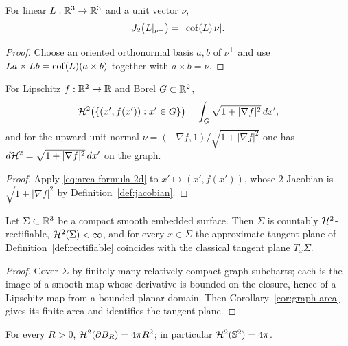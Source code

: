 \begin{lemma}\label{lem:cofactor}
For linear $L:\mathbb R^3\to\mathbb R^3$ and a unit vector $\nu$,
\begin{equation}\label{eq:cofactor}
  J_2\bigl(L|_{\nu^\perp}\bigr)=|\operatorname{cof}(L)\,\nu| .
\end{equation}
\end{lemma}

\begin{proof}
Choose an oriented orthonormal basis $a,b$ of $\nu^\perp$ and use
$La\times Lb=\operatorname{cof}(L)(a\times b)$ together with $a\times b=\nu$.
\end{proof}

\begin{corollary}\label{cor:graph-area}
For Lipschitz $f:\mathbb R^2\to\mathbb R$ and Borel $G\subset\mathbb R^2$,
\[
  \mathcal H^2\bigl(\{(x',f(x')):x'\in G\}\bigr)
  =\int_G\sqrt{1+|\nabla f|^2}\,dx' ,
\]
and for the upward unit normal
$\nu=(-\nabla f,1)/\sqrt{1+|\nabla f|^2}$ one has
$d\mathcal H^2=\sqrt{1+|\nabla f|^2}\,dx'$ on the graph.
\end{corollary}

\begin{proof}
Apply \eqref{eq:area-formula-2d} to $x'\mapsto(x',f(x'))$, whose
$2$-Jacobian is $\sqrt{1+|\nabla f|^2}$ by Definition~\ref{def:jacobian}.
\end{proof}

\begin{lemma}\label{lem:smooth-surface-rectifiable}
Let $\Sigma\subset\mathbb R^3$ be a compact smooth embedded surface.  Then $\Sigma$ is
countably $\mathcal H^2$-rectifiable, $\mathcal H^2(\Sigma)<\infty$, and for every
$x\in\Sigma$ the approximate tangent plane of
Definition~\ref{def:rectifiable} coincides with the classical tangent plane
$T_x\Sigma$.
\end{lemma}

\begin{proof}
Cover $\Sigma$ by finitely many relatively compact graph subcharts; each is
the image of a smooth map whose derivative is bounded on the closure, hence
of a Lipschitz map from a bounded planar domain.  Then
Corollary~\ref{cor:graph-area} gives its finite area and identifies the
tangent plane.
\end{proof}

\begin{lemma}\label{lem:sphere-area}
For every $R>0$, $\mathcal H^2(\partial B_R)=4\pi R^2$; in particular
$\mathcal H^2(\mathbb S^2)=4\pi$.
\end{lemma}

